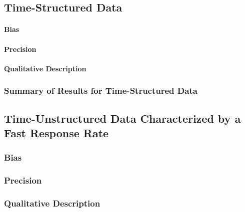 \documentclass[
12pt, %
twoside,
english]{guelphthesis}
\begin{document}
\hypertarget{concise-example-exp3}{%
\subsection{Time-Structured Data}\label{concise-example-exp3}}

\hypertarget{bias-time-struc-exp3}{%
\paragraph{Bias}\label{bias-time-struc-exp3}}

\hypertarget{precision-time-struc-exp3}{%
\paragraph{Precision}\label{precision-time-struc-exp3}}

\hypertarget{qualitative-time-struc-exp3}{%
\paragraph{Qualitative Description}\label{qualitative-time-struc-exp3}}

\hypertarget{summary-of-results-for-time-structured-data}{%
\subsubsection{Summary of Results for Time-Structured Data}\label{summary-of-results-for-time-structured-data}}

\hypertarget{time-unstructured-data-characterized-by-a-fast-response-rate}{%
\subsection{Time-Unstructured Data Characterized by a Fast Response Rate}\label{time-unstructured-data-characterized-by-a-fast-response-rate}}

\hypertarget{bias-fast-exp3}{%
\subsubsection{Bias}\label{bias-fast-exp3}}

\hypertarget{precision-fast-exp3}{%
\subsubsection{Precision}\label{precision-fast-exp3}}

\hypertarget{qualitative-fast-exp3}{%
\subsubsection{Qualitative Description}\label{qualitative-fast-exp3}}
\end{document}
